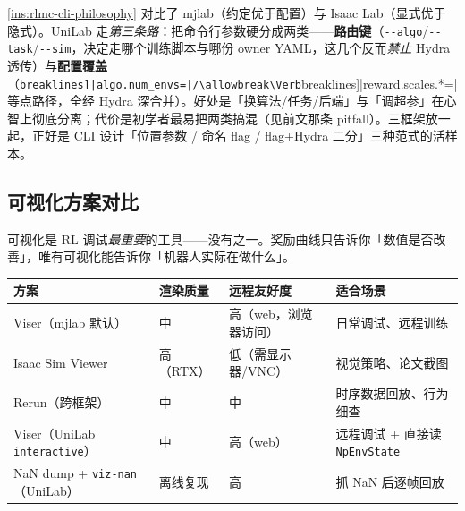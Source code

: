 \begin{note}
\cref{ins:rlmc-cli-philosophy} 对比了 mjlab（约定优于配置）与 Isaac Lab（显式优于隐式）。UniLab 走\emph{第三条路}：把命令行参数硬分成两类——\textbf{路由键}（\verb|--algo|/\allowbreak\verb|--task|/\allowbreak\verb|--sim|，决定走哪个训练脚本与哪份 owner YAML，这几个反而\emph{禁止} Hydra 透传）与\textbf{配置覆盖}（\Verb[breaklines]|algo.num_envs=|/\allowbreak\Verb[breaklines]|reward.scales.*=| 等点路径，全经 Hydra 深合并）。好处是「换算法/任务/后端」与「调超参」在心智上彻底分离；代价是初学者最易把两类搞混（见前文那条 pitfall）。三框架放一起，正好是 CLI 设计「位置参数 / 命名 flag / flag+Hydra 二分」三种范式的活样本。
\end{note}


\subsection{可视化方案对比}

可视化是 RL 调试\emph{最重要}的工具——没有之一。奖励曲线只告诉你「数值是否改善」，唯有可视化能告诉你「机器人实际在做什么」。

\begin{center}
\small
\begin{tabular}{@{}llll@{}}
\toprule
方案 & 渲染质量 & 远程友好度 & 适合场景 \\
\midrule
Viser（mjlab 默认） & 中 & 高（web，浏览器访问） & 日常调试、远程训练 \\
Isaac Sim Viewer & 高（RTX） & 低（需显示器/VNC） & 视觉策略、论文截图 \\
Rerun（跨框架） & 中 & 中 & 时序数据回放、行为细查 \\
Viser（UniLab \verb|interactive|） & 中 & 高（web） & 远程调试 + 直接读 \verb|NpEnvState| \\
NaN dump + \verb|viz-nan|（UniLab） & 离线复现 & 高 & 抓 NaN 后逐帧回放 \\
\bottomrule
\end{tabular}
\end{center}

